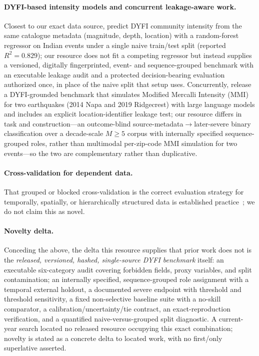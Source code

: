 \documentclass[pdflatex,sn-basic,iicol]{sn-jnl}
\begin{document}
\paragraph{DYFI-based intensity models and concurrent leakage-aware work.}
Closest to our exact data source, \citet{kumar2025dyfiindia} predict DYFI
community intensity from the same catalogue metadata (magnitude, depth, location)
with a random-forest regressor on Indian events under a single naive train/test
split (reported $R^2=0.829$); our resource does not fit a competing regressor but
instead supplies a versioned, digitally fingerprinted, event- and
sequence-grouped benchmark with an executable leakage audit and a protected
decision-bearing evaluation authorized once, in place of
the naive split that setup uses. Concurrently, \citet{li2025llmworldmodels}
release a DYFI-grounded benchmark that simulates Modified Mercalli Intensity
(MMI) for
two earthquakes (2014 Napa and 2019 Ridgecrest) with large language models and
includes an explicit location-identifier leakage test; our resource differs in
task and construction---an outcome-blind source-metadata$\rightarrow$later-severe
binary classification over a decade-scale $M\geq5$ corpus with internally specified
sequence-grouped roles, rather than multimodal per-zip-code MMI simulation for two
events---so the two are complementary rather than duplicative.

\paragraph{Cross-validation for dependent data.} That grouped or blocked
cross-validation is the correct evaluation strategy for temporally, spatially,
or hierarchically structured data is established
practice~\citep{roberts2017cv,kaufman2012leakage}; we do not claim this as novel.

\paragraph{Novelty delta.} Conceding the above, the delta this resource supplies
that prior work does not is the \emph{released, versioned, hashed, single-source
DYFI benchmark} itself: an executable six-category audit covering forbidden
fields, proxy variables, and split contamination; an internally specified,
sequence-grouped role assignment with a
temporal external holdout, a documented severe endpoint with threshold and
threshold sensitivity, a fixed non-selective baseline suite with a no-skill
comparator, a calibration/uncertainty/tie contract, an exact-reproduction
verification, and a quantified naive-versus-grouped split diagnostic. A
current-year search located no released resource occupying this exact
combination; novelty is stated as a concrete delta to located work, with no
first/only superlative asserted.
\end{document}
